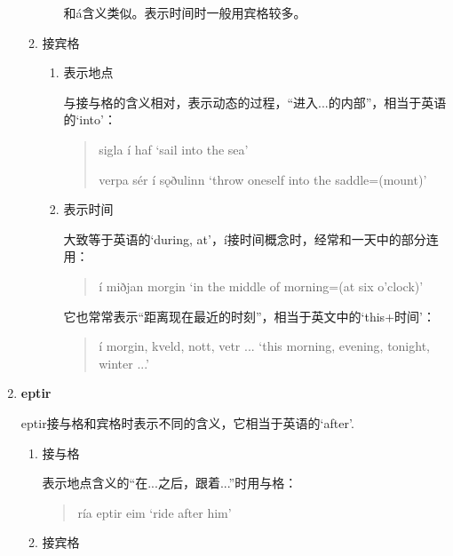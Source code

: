 \begin{enumerate}[itemindent=1em, label=\textbf{\arabic*}.]
\begin{enumerate}
\begin{enumerate}
                              和á含义类似。表示时间时一般用宾格较多。
                    \end{enumerate}
              \item 接宾格
                    \begin{enumerate}
                        \item 表示地点

                              与接与格的含义相对，表示动态的过程，“进入...的内部”，相当于英语的`into'：
                              \begin{quote}
                                  sigla í haf `sail into the sea'

                                  verpa sér í s\k{o}ðulinn `throw oneself into the saddle=(mount)'
                              \end{quote}
                        \item 表示时间

                              大致等于英语的`during, at'，í接时间概念时，经常和一天中的部分连用：
                              \begin{quote}
                                  í miðjan morgin `in the middle of morning=(at six o'clock)'
                              \end{quote}
                              它也常常表示“距离现在最近的时刻”，相当于英文中的`this+时间'：
                              \begin{quote}
                                  í morgin, kveld, nott, vetr ... `this morning, evening, tonight, winter ...'
                              \end{quote}
                    \end{enumerate}
          \end{enumerate}

    \item \textbf{eptir}

          eptir接与格和宾格时表示不同的含义，它相当于英语的`after'.
          \begin{enumerate}
              \item 接与格

                    表示地点含义的“在...之后，跟着...”时用与格：
                    \begin{quote}
                        rí\dh a eptir \th eim `ride after him'
                    \end{quote}

              \item 接宾格


\end{enumerate}
\end{enumerate}
